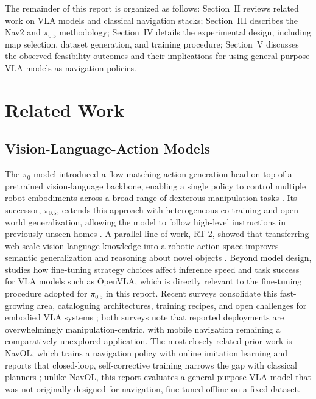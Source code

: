\documentclass[conference]{IEEEtran}
\begin{document}
The remainder of this report is organized as follows: Section~II reviews related work on VLA models and classical navigation stacks; Section~III describes the Nav2 and $\pi_{0.5}$ methodology; Section~IV details the experimental design, including map selection, dataset generation, and training procedure; Section~V discusses the observed feasibility outcomes and their implications for using general-purpose VLA models as navigation policies.

\section{Related Work}

\subsection{Vision-Language-Action Models}
The $\pi_0$ model introduced a flow-matching action-generation head on top of a pretrained vision-language backbone, enabling a single policy to control multiple robot embodiments across a broad range of dexterous manipulation tasks \cite{black2024pi0}. Its successor, $\pi_{0.5}$, extends this approach with heterogeneous co-training and open-world generalization, allowing the model to follow high-level instructions in previously unseen homes \cite{black2025pi05}. A parallel line of work, RT-2, showed that transferring web-scale vision-language knowledge into a robotic action space improves semantic generalization and reasoning about novel objects \cite{brohan2023rt2}. Beyond model design, \cite{kim2025finetuningvla} studies how fine-tuning strategy choices affect inference speed and task success for VLA models such as OpenVLA, which is directly relevant to the fine-tuning procedure adopted for $\pi_{0.5}$ in this report. Recent surveys consolidate this fast-growing area, cataloguing architectures, training recipes, and open challenges for embodied VLA systems \cite{ma2025surveyembodied, sapkota2025vlaapplications}; both surveys note that reported deployments are overwhelmingly manipulation-centric, with mobile navigation remaining a comparatively unexplored application. The most closely related prior work is NavOL, which trains a navigation policy with online imitation learning and reports that closed-loop, self-corrective training narrows the gap with classical planners \cite{wei2026navol}; unlike NavOL, this report evaluates a general-purpose VLA model that was not originally designed for navigation, fine-tuned offline on a fixed dataset.
\end{document}
